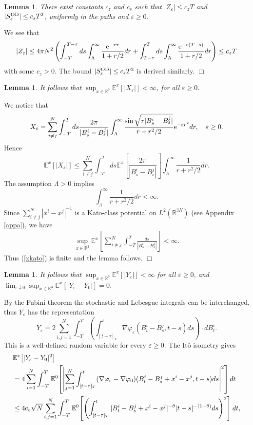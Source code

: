 \documentclass[11pt]{article}
\newtheorem{lemma}[theorem]{Lemma}
\newcommand{\bl}[1]{\begin{lemma}\label{#1}}
\newcommand{\el}{\end{lemma}}
\newcommand{\Ebb}{{\mathbb E}}
\providecommand{\eq}[1]{\begin{equation}\label{#1}}
\providecommand{\en}{\end{equation}}
\renewcommand{\d}{\displaystyle}
\providecommand{\qed}{\hfill {$\Box$}\par\medskip}
\providecommand{\BR}{{\mathbb{R}^3 }}
\providecommand{\iijj}{\sum_{i,j=1}^N}
\renewcommand{\ij}{\sum_{i\not=j}^N}
\providecommand{\od}{{\rm OD}}
\providecommand{\RR}{\mathbb{R}}
\providecommand{\kak}[1]{(\ref{#1})}
\providecommand{\lk}{\left(}
\providecommand{\rk}{\right)}
\providecommand{\non}{\nonumber}
\providecommand{\e}{{\rm e}}
\providecommand{\1}{\mathbb{1}}
\providecommand{\eps}{\varepsilon}
\providecommand{\ce}{{\rm c}_\eps}
\newcounter {constant}
\begin{document}
\bl{finitez}
There exist constants $c_z$ and $c_s$ such that $|Z_\eps|\leq c_z T$ and $|S_\eps^{\od}|\leq c_s T^2$,
uniformly in the paths and $\eps\geq0$.
\el
\proof
We see that
\begin{align*}
|Z_\eps|
\leq
4\pi N^2 \lk
\int_{-T}^{T-\tau} ds  \int_{\Lambda}^\infty \frac{\e^{-r\tau }}{1+r/2}dr +
\int_{T-\tau}^{T} ds  \int_{\Lambda}^\infty \frac{\e^{-r(T-s)}}{1+r/2}dr\rk
\leq c_z T
\end{align*}
with some $c_z > 0$. The bound $|S_\eps^{\od}|\leq c_s T^2$ is derived similarly.
\qed
\bl{finite}
It follows that $\d \sup_{x\in\BR} \Ebb^x[|X_\eps|]<\infty$, for all $\eps\geq 0$.
\el
\proof
We notice that
\eq{225}
X_\eps =\ij\int_{-T}^ T ds \frac{2\pi}{|B_s^i-B_s^j|}
\int_\Lambda^\infty \frac{\sin\sqrt{r|B_s^i-B_s^j|}}{r+r^2/2}\e^{-\eps r^2} dr,\quad \eps\geq0.
\en
Hence
\eq{xkato}
\Ebb^x\!\left[|X_\eps|\right]
\leq
\ij\int_{-T}^ {T} ds \Ebb^x \left[\frac{2\pi}{|B_s^i-B_s^j|}\right]
\int_\Lambda^\infty \frac{1}{r+r^2/2}dr.
\en
The assumption
$\Lambda>0$ implies
\eq{IRbound}
\int_\Lambda^\infty \frac{1}{r+r^2/2} dr<\infty.
\en
Since $\ij |x^i-x^j|^{-1}$  is a Kato-class potential on $L^2(\RR^{3N})$ (see Appendix \ref{appa}),
we have
\begin{align*}
\sup_{x\in\BR} \Ebb^x\!\left [\ij  \int_{-T}^ T \frac{ds}{|B_s^i-B_s^j|} \right] <\infty.
\end{align*}
Thus \kak{xkato} is finite and the lemma follows.
\qed
\begin{lemma}
\label{prop:convergence}
It follows that $\d \sup_{x\in\BR}\Ebb^x [|Y_\eps|]<\infty$ for all $\eps\geq 0$, and
$\d \lim_{\eps\downarrow0}\sup_{x\in\BR}  \Ebb^x [|Y_\eps -Y_0 |]=0$.
\end{lemma}
\proof
By the Fubini theorem the stochastic and Lebesgue integrals can be interchanged, thus $Y_\eps$ has
the representation
\begin{equation}
\label{eq:WI-renorm-1-bis}
Y_\eps = 2 \iijj \int_{-T}^T \lk  \int_{[t-\tau]_T}^t  \nabla \varphi_\eps(B_t^i-B_s^j,t-s) ds \rk
\cdot dB_t^i.
\end{equation}
This is a well-defined random variable for every $\eps \geq 0$. The It\^o isometry gives
\begin{equation}
\label{228}
\begin{split}
&\Ebb^x\!\left[|Y_\eps-Y_0|^2 \right]\non \\
& =
4 \sum_{i=1}^N \int_{-T}^T
\Ebb^0\!\left[\left| \sum_{j=1}^N \int_{[t-\tau]_T}^t(\nabla \varphi_\eps-\nabla \varphi_0)
(B_t^i-B_s^j+x^i-x^j,t-s)ds \right|^2 \right] dt
\non \\ &
\le
4\ce   \sqrt N\iijj \int_{-T}^T
\Ebb^0\!\left[\lk\int_{[t-\tau]_T}^t |B_t^i-B_s^j+x^i-x^j|^{-\theta} |t-s|^{-(1-\theta)} ds\rk^2 \right] dt,
\non
\end{split}
\end{equation}
\end{document}
